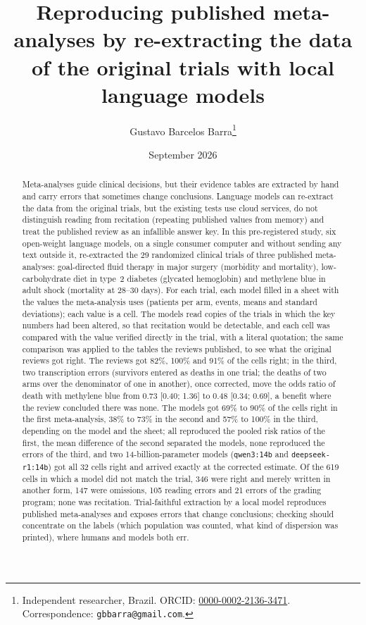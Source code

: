 \documentclass[11pt]{article}
\title{\textbf{Reproducing published meta-analyses by re-extracting the data of the original trials with local language models}}
\author{Gustavo Barcelos Barra\thanks{Independent researcher, Brazil. ORCID: \href{https://orcid.org/0000-0002-2136-3471}{0000-0002-2136-3471}. Correspondence: \texttt{gbbarra@gmail.com}.}}
\date{September 2026}
\begin{document}
\maketitle

\begin{abstract}
\noindent Meta-analyses guide clinical decisions, but their evidence tables are extracted by hand and carry errors that sometimes change conclusions. Language models can re-extract the data from the original trials, but the existing tests use cloud services, do not distinguish reading from recitation (repeating published values from memory) and treat the published review as an infallible answer key. In this pre-registered study, six open-weight language models, on a single consumer computer and without sending any text outside it, re-extracted the 29 randomized clinical trials of three published meta-analyses: goal-directed fluid therapy in major surgery (morbidity and mortality), low-carbohydrate diet in type~2 diabetes (glycated hemoglobin) and methylene blue in adult shock (mortality at 28--30 days). For each trial, each model filled in a sheet with the values the meta-analysis uses (patients per arm, events, means and standard deviations); each value is a cell. The models read copies of the trials in which the key numbers had been altered, so that recitation would be detectable, and each cell was compared with the value verified directly in the trial, with a literal quotation; the same comparison was applied to the tables the reviews published, to see what the original reviews got right. The reviews got 82\%, 100\% and 91\% of the cells right; in the third, two transcription errors (survivors entered as deaths in one trial; the deaths of two arms over the denominator of one in another), once corrected, move the odds ratio of death with methylene blue from 0.73 [0.40; 1.36] to 0.48 [0.34; 0.69], a benefit where the review concluded there was none. The models got 69\% to 90\% of the cells right in the first meta-analysis, 38\% to 73\% in the second and 57\% to 100\% in the third, depending on the model and the sheet; all reproduced the pooled risk ratios of the first, the mean difference of the second separated the models, none reproduced the errors of the third, and two 14-billion-parameter models (\texttt{qwen3:14b} and \texttt{deepseek-r1:14b}) got all 32 cells right and arrived exactly at the corrected estimate. Of the 619 cells in which a model did not match the trial, 346 were right and merely written in another form, 147 were omissions, 105 reading errors and 21 errors of the grading program; none was recitation. Trial-faithful extraction by a local model reproduces published meta-analyses and exposes errors that change conclusions; checking should concentrate on the labels (which population was counted, what kind of dispersion was printed), where humans and models both err.
\end{abstract}
\end{document}
